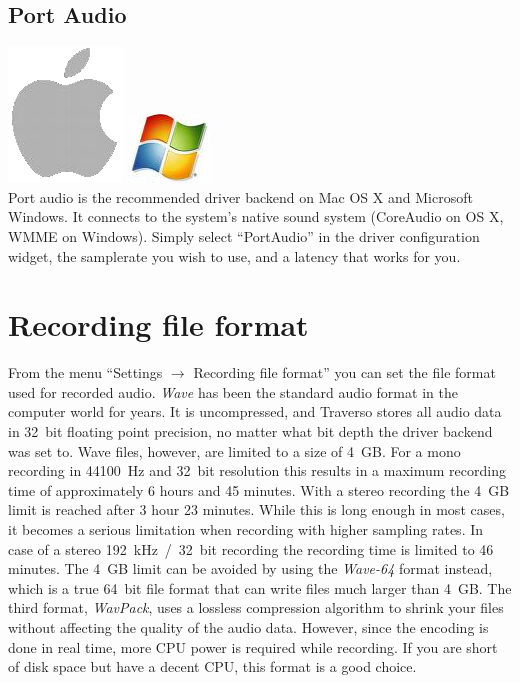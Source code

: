 \subsection{Port Audio}
\includegraphics[height=\baselineskip]{../images/mac.png}
\includegraphics[height=\baselineskip]{../images/win.png}
\\
Port audio is the recommended driver backend on Mac OS X and Microsoft Windows. It connects to the system's native sound system (CoreAudio on OS X, WMME on Windows). Simply select ``PortAudio'' in the driver configuration widget, the samplerate you wish to use, and a latency that works for you.

\section{Recording file format}
From the menu ``Settings $\rightarrow$ Recording file format'' you can set the file format used for recorded audio. \emph{Wave} has been the standard audio format in the computer world for years. It is uncompressed, and Traverso stores all audio data in 32~bit floating point precision, no matter what bit depth the driver backend was set to. Wave files, however, are limited to a size of 4~GB. For a mono recording in 44100~Hz and 32~bit resolution this results in a maximum recording time of approximately 6 hours and 45 minutes. With a stereo recording the 4~GB limit is reached after 3 hour 23 minutes. While this is long enough in most cases, it becomes a serious limitation when recording with higher sampling rates. In case of a stereo 192~kHz~/~32~bit recording the recording time is limited to 46 minutes. The 4~GB limit can be avoided by using the \emph{Wave-64} format instead, which is a true 64~bit file format that can write files much larger than 4~GB. The third format, \emph{WavPack}, uses a lossless compression algorithm to shrink your files without affecting the quality of the audio data. However, since the encoding is done in real time, more CPU power is required while recording. If you are short of disk space but have a decent CPU, this format is a good choice.
